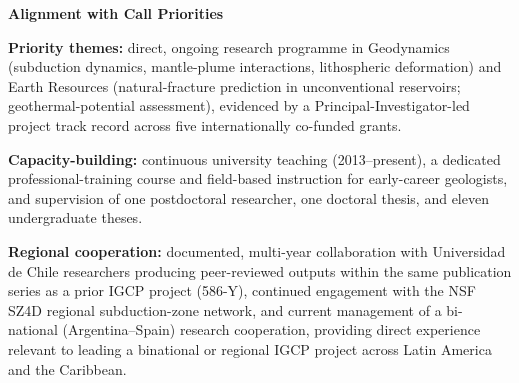 \documentclass[10pt,a4paper]{../awesome-cv}
\makeatletter
\renewcommand*{\sectionstyle}[1]{{\fontsize{12.5pt}{15pt}\bodyfont\bfseries\color{text}\@sectioncolor #1}}
\renewcommand{\cvsection}[1]{%
  \par\vspace{3mm}%
  \sectionstyle{#1}%
  \phantomsection%
  \color{gray}\vhrulefill{0.9pt}%
  \par\nobreak\vspace{1.8mm}%
}
\makeatother
\begin{document}
\cvsection{Alignment with Call Priorities}
\begin{cvparagraph}
\textbf{Priority themes:} direct, ongoing research programme in Geodynamics (subduction dynamics, mantle-plume interactions, lithospheric deformation) and Earth Resources (natural-fracture prediction in unconventional reservoirs; geothermal-potential assessment), evidenced by a Principal-Investigator-led project track record across five internationally co-funded grants.

\textbf{Capacity-building:} continuous university teaching (2013--present), a dedicated professional-training course and field-based instruction for early-career geologists, and supervision of one postdoctoral researcher, one doctoral thesis, and eleven undergraduate theses.

\textbf{Regional cooperation:} documented, multi-year collaboration with Universidad de Chile researchers producing peer-reviewed outputs within the same publication series as a prior IGCP project (586-Y), continued engagement with the NSF SZ4D regional subduction-zone network, and current management of a bi-national (Argentina--Spain) research cooperation, providing direct experience relevant to leading a binational or regional IGCP project across Latin America and the Caribbean.
\end{cvparagraph}
\end{document}
